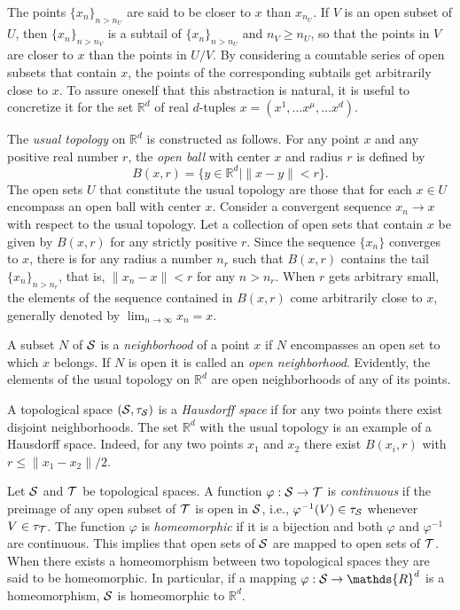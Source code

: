 \documentclass[
final,
11pt,
a4paper,
DIV=11,
headinclude=true,
footinclude=false,
bibliography=totoc,
twoside=true,  %
BCOR=5mm
]{scrbook}
\begin{document}
The points ${\{x_n\}}_{n > n_U}$ are said to be closer to $x$ 
than $x_{n_U}$. If $V$ is an open subset of $U$, then 
${\{x_n\}}_{n > n_V}$ is a subtail of ${\{x_n\}}_{n > n_U}$ and 
$n_V \geq n_U$, so that the points in $V$ are closer to $x$ than 
the points in $U/V$. By considering a countable series of open 
subsets that contain $x$, the points of the corresponding 
subtails get arbitrarily close to $x$. To assure oneself that 
this abstraction is natural, it is useful to concretize it for 
the set $\mathds{R}^d$ of real $d$-tuples $x = (x^1,\ldots 
x^\mu,\ldots x^d)$.

\begin{example}
The \emph{usual topology} on $\mathds{R}^d$ is constructed as 
follows. For any point $x$ and any positive real number $r$, the 
\emph{open ball} with center $x$ and radius $r$ is defined by
\begin{equation*}
B(x,r) = \{y \in \mathds{R}^d \mid \|x-y\| < r \}.
\end{equation*}
The open sets $U$ that constitute the usual topology are those 
that for each $x \in U$ encompass an open ball with center $x$.  
Consider a convergent sequence $x_n \to x$ with respect to the 
usual topology. Let a collection of open sets that contain $x$ be 
given by $B(x,r)$ for any strictly positive $r$. Since the 
sequence $\{x_n\}$ converges to $x$, there is for any radius 
a number $n_r$ such that $B(x,r)$ contains the tail ${\{x_n\}}_{n 
  > n_r}$, that is, $\|x_n - x\| < r$ for any $n > n_r$. When $r$ 
gets arbitrary small, the elements of the sequence contained in 
$B(x,r)$ come arbitrarily close to $x$, generally denoted by 
$\lim_{n\to\infty}x_n = x$.
\end{example}

A subset $N$ of $\mathcal{S}$ is a \emph{neighborhood} of a point $x$ 
if $N$ encompasses an open set to which $x$ belongs. If $N$ is 
open it is called an \emph{open neighborhood}. Evidently, the 
elements of the usual topology on $\mathds{R}^d$ are open 
neighborhoods of any of its points.

A topological space $(\mathcal{S},\tau_\mathcal{S})$ is a \emph{Hausdorff 
  space} if for any two points there exist disjoint 
neighborhoods. The set $\mathds{R}^d$ with the usual topology is 
an example of a Hausdorff space. Indeed, for any two points $x_1$ 
and $x_2$ there exist $B(x_i,r)$ with $r \leq \|x_1-x_2\|/2$.

Let $\mathcal{S}$ and $\mathcal{T}$ be topological spaces. A function 
$\varphi : \mathcal{S} \to \mathcal{T}$ is \emph{continuous} if the 
preimage of any open subset of $\mathcal{T}$ is open in $\mathcal{S}$, 
i.e., $\varphi^{-1}(V) \in \tau_\mathcal{S}$ whenever $V \in 
\tau_\mathcal{T}$.  The function $\varphi$ is \emph{homeomorphic} if 
it is a bijection and both $\varphi$ and $\varphi^{-1}$ are 
continuous. This implies that open sets of $\mathcal{S}$ are mapped to 
open sets of $\mathcal{T}$.  When there exists a homeomorphism between 
two topological spaces they are said to be homeomorphic.  In 
particular, if a mapping $\varphi : \mc{S} \to \mathds{R}^d$ is a 
homeomorphism, $\mathcal{S}$ is homeomorphic to $\mathds{R}^d$.
\end{document}
